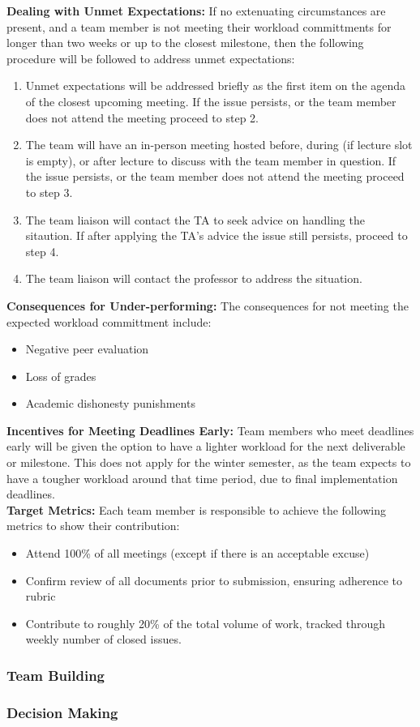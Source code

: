 \documentclass{article}
\begin{document}
\noindent\textbf{Dealing with Unmet Expectations:}
If no extenuating circumstances are present, and a team member is not meeting their workload committments for longer than two weeks or up to the closest milestone, then the following procedure will be followed to address unmet expectations: \\

\begin{enumerate}
  \item Unmet expectations will be addressed briefly as the first item on the agenda of the closest upcoming meeting. If the issue persists, or the team member does not attend the meeting
  proceed to step 2.
  \item The team will have an in-person meeting hosted before, during (if lecture slot is empty), or after lecture to discuss with the team member in question. If the issue persists, or the team member does not attend the meeting
  proceed to step 3.
  \item The team liaison will contact the TA to seek advice on handling the sitaution. If after applying the TA's advice the issue still persists, proceed to step 4.
  \item The team liaison will contact the professor to address the situation.
\end{enumerate}

\noindent\textbf{Consequences for Under-performing:}
The consequences for not meeting the expected workload committment include: 
\begin{itemize}
  \item Negative peer evaluation
  \item Loss of grades
  \item Academic dishonesty punishments
\end{itemize}


\noindent\textbf{Incentives for Meeting Deadlines Early:} Team members who meet deadlines early will be given the option
to have a lighter workload for the next deliverable or milestone. This does not apply for the winter semester,
as the team expects to have a tougher workload around that time period, due to final implementation deadlines. \\

\noindent\textbf{Target Metrics:}
Each team member is responsible to achieve the following metrics to show their contribution:
\begin{itemize}
  \item Attend 100\% of all meetings (except if there is an acceptable excuse)
  \item Confirm review of all documents prior to submission, ensuring adherence to rubric
  \item Contribute to roughly 20\% of the total volume of work, tracked through weekly number of closed issues.
\end{itemize}


\subsubsection*{Team Building}


\subsubsection*{Decision Making} 

\end{document}
